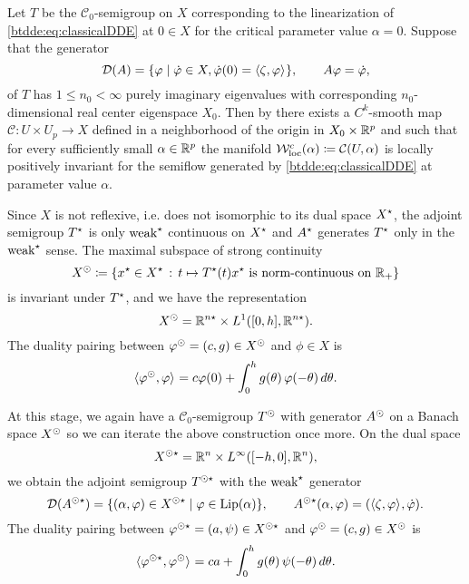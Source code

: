 Let $T$ be the $\mathcal{C}_0$-semigroup on $X$ corresponding to the linearization of \cref{btdde:eq:classicalDDE} at $0 \in X$ for the critical parameter value $\alpha = 0$. Suppose that the generator 
\[
    \mathcal{D}{(A)}  = \{ \varphi \mid \dot {\varphi} \in X, \dot {\varphi}(0) = \langle \zeta,\varphi \rangle_{}\}, 
    \qquad 
    A\varphi = \dot {\varphi},
\]
of $T$ has $1 \le n_0 < \infty$ purely imaginary eigenvalues with corresponding $n_0$-dimensional real center eigenspace $X_0$. Then by \cite[Corollary 20]{Switching2019} there exists a $C^k$-smooth map $\mathcal{C} : U \times U_p \to X$ defined in a neighborhood of the origin in $X_0 \times \mathbb{R}^p$ and such that for every sufficiently small $\alpha \in \mathbb{R}^p$ the manifold $\mathcal{W}^c_{\text{loc}}(\alpha) \coloneqq \mathcal{C}(U,\alpha)$ is locally positively invariant for the semiflow generated by \cref{btdde:eq:classicalDDE} at parameter value $\alpha$.

Since $X$ is not reflexive, i.e. does not isomorphic to its dual space $X^{\star}$, the adjoint semigroup $T^{\star}$ is  only $\text{weak}^{\star}$ continuous on $X^{\star}$ and $A^{\star}$ generates $T^{\star}$ only in the $\text{weak}^{\star}$ sense. The maximal subspace of strong continuity
\[
X^{\odot} \coloneqq \left\{x^{\star} \in X^{\star} \,:\, 
    t \mapsto T^{\star}(t)x^{\star} \text{ is norm-continuous on } \mathbb{R}_+\right\}
\]
is invariant under $T^{\star}$, and we have the representation
\begin{equation}
  \label{btdde:eq:xsun_dde}
  X^{\odot} = \mathbb{R}^{n\star} \times L^1([0,h],\mathbb{R}^{n\star}).
\end{equation}
%
The duality pairing between $\varphi^{\odot} = (c,g) \in X^{\odot}$ and $\phi \in X$ is
\begin{equation}
  \label{btdde:eq:pairing_X_sun_X}
  \langle \varphi^{\odot},\varphi \rangle_{} = c\varphi(0)+ \int_{0}^{h}g(\theta)\,\varphi(-\theta)\,d\theta.
\end{equation}

At this stage, we again have a $\mathcal{C}_0$-semigroup $T^{\odot}$ with generator $A^{\odot}$ on a Banach space $X^{\odot}$ so we can iterate the above construction once more. On the dual space 
  \[
    X^{\odot\star} = \mathbb{R}^n \times L^\infty([-h,0], \mathbb{R}^n),
  \]
we obtain the adjoint semigroup $T^{\odot\star}$ with the $\text{weak}^{\star}$ generator  
\begin{equation}
    \label{btdde:eq:A_sunstar}
    \mathcal{D}{(A^{\odot\star})}  = \{ (\alpha,\varphi) \in X^{\odot\star} \mid \varphi \in \operatorname{Lip}(\alpha) \}, 
    \qquad 
    A^{\odot\star}(\alpha,\varphi) = ( \langle \zeta,\varphi \rangle_{}, \dot {\varphi} ).
\end{equation}
The duality pairing between $\varphi^{\odot\star} = (a,\psi) \in X^{\odot\star}$ and
$\varphi^{\odot} = (c,g) \in X^{\odot}$ is
\begin{equation}
  \label{btdde:eq:pairing_X_sun_star_X_sun}
  \langle \varphi^{\odot\star},\varphi^{\odot} \rangle_{} = 
    ca + \int_{0}^{h}g(\theta)\,\psi(-\theta)\,d\theta.
\end{equation}

